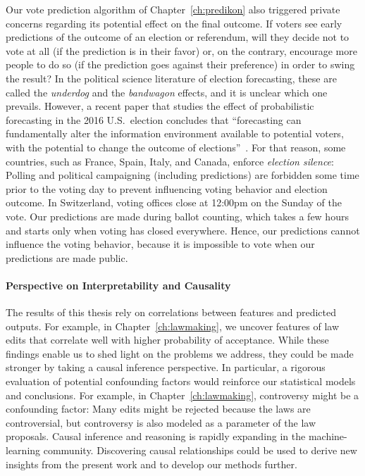 Our vote prediction algorithm of Chapter~\ref{ch:predikon} also triggered private concerns regarding its potential effect on the final outcome.
If voters see early predictions of the outcome of an election or referendum, will they decide not to vote at all (if the prediction is in their favor) or, on the contrary, encourage more people to do so (if the prediction goes against their preference) in order to swing the result?
In the political science literature of election forecasting, these are called the \emph{underdog} and the \emph{bandwagon} effects, and it is unclear which one prevails.
However, a recent paper that studies the effect of probabilistic forecasting in the 2016 U.S.\ election concludes that ``forecasting can fundamentally alter the information environment available to potential voters, with the potential to change the outcome of elections''~\citep{westwood2020projecting}.
For that reason, some countries, such as France, Spain, Italy, and Canada, enforce \emph{election silence}:
Polling and political campaigning (including predictions) are forbidden some time prior to the voting day to prevent influencing voting behavior and election outcome.
In Switzerland, voting offices close at 12:00pm on the Sunday of the vote.
Our predictions are made during ballot counting, which takes a few hours and starts only when voting has closed everywhere.
Hence, our predictions cannot influence the voting behavior, because it is impossible to vote when our predictions are made public.

\paragraph{Perspective on Interpretability and Causality}

The results of this thesis rely on correlations between features and predicted outputs.
For example, in Chapter~\ref{ch:lawmaking}, we uncover features of law edits that correlate well with higher probability of acceptance.
While these findings enable us to shed light on the problems we address, they could be made stronger by taking a causal inference perspective.
In particular, a rigorous evaluation of potential confounding factors would reinforce our statistical models and conclusions.
For example, in Chapter~\ref{ch:lawmaking}, controversy might be a confounding factor:
Many edits might be rejected because the laws are controversial, but controversy is also modeled as a parameter of the law proposals.
Causal inference and reasoning is rapidly expanding in the machine-learning community.
Discovering causal relationships could be used to derive new insights from the present work and to develop our methods further.

